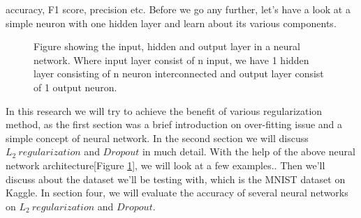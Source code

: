 \documentclass{article}
\begin{document}
\begin{multicols}{2}
accuracy, F1 score, precision etc. Before we go any further, let's have a look at a simple neuron with one hidden layer and learn about its various components.
\begin{figure}[H]
\label{fig:2}

    \caption{Figure showing the input, hidden and output layer in a neural network. Where input layer consist of n input, we have 1 hidden layer consisting of n neuron interconnected and output layer consist of 1 output neuron. }
  \end{figure}
In this research we will try to achieve the benefit of various regularization method, as the first section was a brief introduction on over-fitting issue and a simple concept of neural network. In the second section we will discuss $L_2 \ regularization$ and $Dropout$ in much detail. With the help of the above neural network architecture[Figure \ref{fig:2}], we will look at a few examples.. Then we'll discuss about the dataset we'll be testing with, which is the MNIST dataset on Kaggle\cite{lecun-mnisthandwrittendigit-2010}. In section four, we will evaluate the accuracy of several neural networks on $L_2 \ regularization$ and $Dropout$.

\end{multicols}
\end{document}
